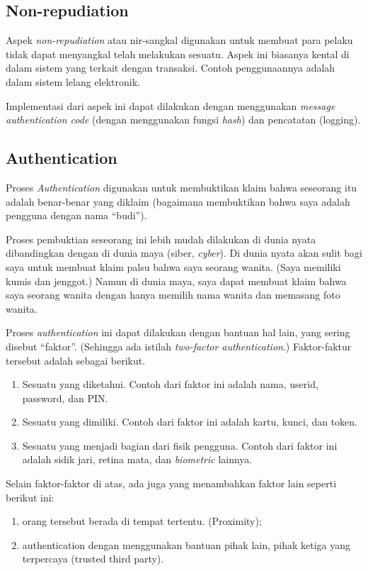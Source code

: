 \subsection{Non-repudiation}
Aspek {\em non-repudiation} atau nir-sangkal digunakan untuk
membuat para pelaku tidak dapat menyangkal telah melakukan sesuatu.
Aspek ini biasanya kental di dalam sistem yang terkait dengan transaksi.
Contoh penggunaannya adalah dalam sistem lelang elektronik.

Implementasi dari aspek ini dapat dilakukan dengan menggunakan
{\em message authentication code} (dengan menggunakan fungsi {\em hash})
dan pencatatan (logging).


\subsection{Authentication}
Proses {\em Authentication} digunakan untuk membuktikan klaim
bahwa seseorang itu adalah benar-benar yang diklaim
(bagaimana membuktikan bahwa saya adalah pengguna dengan nama ``budi'').

Proses pembuktian seseorang ini lebih mudah dilakukan di dunia nyata
dibandingkan dengan di dunia maya (siber, {\em cyber}).
Di dunia nyata akan sulit bagi saya untuk membuat klaim palsu bahwa
saya seorang wanita. (Saya memiliki kumis dan jenggot.)
Namun di dunia maya, saya dapat membuat klaim bahwa saya
seorang wanita dengan hanya memilih nama wanita dan memasang foto
wanita.

Proses {\em authentication} ini dapat dilakukan dengan bantuan
hal lain, yang sering disebut ``faktor''. 
(Sehingga ada istilah {\em two-factor authentication}.)
Faktor-faktur tersebut adalah sebagai berikut.

\begin{enumerate}
\item Sesuatu yang diketahui.
   Contoh dari faktor ini adalah nama, userid, password, dan PIN.
\item Sesuatu yang dimiliki.
   Contoh dari faktor ini adalah kartu, kunci, dan token.
\item Sesuatu yang menjadi bagian dari fisik pengguna.
   Contoh dari faktor ini adalah sidik jari, retina mata,
   dan {\em biometric} lainnya.
\end{enumerate}

Selain faktor-faktor di atas, ada juga yang menambahkan faktor lain
seperti berikut ini:
\begin{enumerate}
\item orang tersebut berada di tempat tertentu. (Proximity);
\item authentication dengan menggunakan bantuan pihak lain,
   pihak ketiga yang terpercaya (trusted third party).
\end{enumerate}
